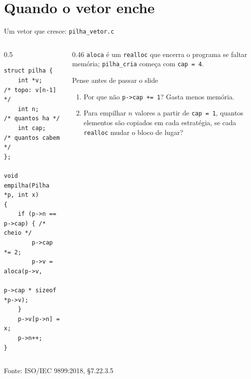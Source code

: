 \documentclass[aspectratio=169]{beamer}
\newcommand{\fonte}[1]{\vfill\hfill{\scriptsize\textcolor{UFSGray}{Fonte: #1}}}
\begin{document}
\section{Quando o vetor enche}

\begin{frame}[fragile]{Um vetor que cresce: \texttt{pilha\_vetor.c}}
  \begin{columns}[T]
    \begin{column}{0.5\textwidth}
\begin{lstlisting}[style=codC]
struct pilha {
    int *v;    /* topo: v[n-1] */
    int n;     /* quantos ha */
    int cap;   /* quantos cabem */
};

void empilha(Pilha *p, int x)
{
    if (p->n == p->cap) { /* cheio */
        p->cap *= 2;
        p->v = aloca(p->v,
                 p->cap * sizeof *p->v);
    }
    p->v[p->n] = x;
    p->n++;
}
\end{lstlisting}
    \end{column}
    \begin{column}{0.46\textwidth}
      \small \texttt{aloca} é um \texttt{realloc} que encerra o programa se
      faltar memória; \texttt{pilha\_cria} começa com \texttt{cap = 4}.
      \begin{block}{Pense antes de passar o slide}
        \small
        \begin{enumerate}
          \item Por que não \texttt{p->cap += 1}? Gasta menos memória.
          \item Para empilhar $n$ valores a partir de \texttt{cap = 1},
            quantos elementos são copiados em cada estratégia, se cada
            \texttt{realloc} mudar o bloco de lugar?
        \end{enumerate}
      \end{block}
    \end{column}
  \end{columns}
  \fonte{ISO/IEC 9899:2018, §7.22.3.5~\cite{iso2018c17}}
\end{frame}
\end{document}
